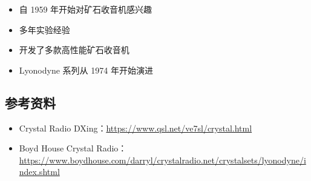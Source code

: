 \begin{itemize}[leftmargin=2cm]
    \item 自 1959 年开始对矿石收音机感兴趣
    \item 多年实验经验
    \item 开发了多款高性能矿石收音机
    \item Lyonodyne 系列从 1974 年开始演进
\end{itemize}

\subsection{参考资料}
\label{subsec:lyonodyne_references}

\begin{itemize}[leftmargin=2cm]
    \item Crystal Radio DXing：\url{https://www.qsl.net/ve7sl/crystal.html}
    \item Boyd House Crystal Radio：\url{https://www.boydhouse.com/darryl/crystalradio.net/crystalsets/lyonodyne/index.shtml}
\end{itemize}
